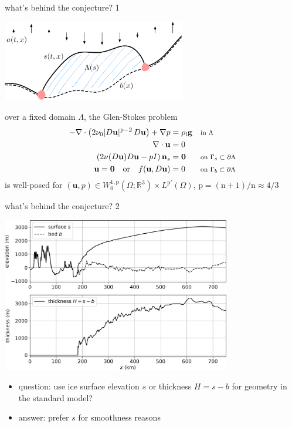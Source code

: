 \documentclass[10pt,dvipsnames]{beamer}
\theoremstyle{theorem}
\newcommand{\bg}{\mathbf{g}}
\newcommand{\bn}{\mathbf{n}}
\newcommand{\bu}{\mathbf{u}}
\newcommand{\bzero}{\bm{0}}
\newcommand{\RR}{\mathbb{R}}
\newcommand{\nn}{\mathrm{n}}
\newcommand{\pp}{\mathrm{p}}
\newcommand{\rhoi}{\rho_{\text{i}}}
\newcommand{\where}[1]{\text{\footnotesize #1}}
\begin{document}
\begin{frame}{what's behind the conjecture? 1}

\begin{center}
\includegraphics[width=0.6\textwidth]{stokesdomain}
\end{center}

\begin{theorem}
over a fixed domain $\Lambda$, the Glen-Stokes problem
\begin{align*}
- \nabla \cdot \left(2 \nu_0 |D\bu|^{\pp-2}\, D\bu\right) + \nabla p &= \rhoi \bg && \where{in $\Lambda$} \\
\nabla \cdot \bu &= 0 \\
\left(2 \nu(D\bu) D\bu - pI\right) \bn_s &= \bzero && \where{on $\Gamma_s \subset \partial\Lambda$} \\
\bu  = \bzero \quad \text{or} \quad f(\bu,D\bu) &= 0 && \where{on $\Gamma_b \subset \partial\Lambda$}
\end{align*}
is well-posed for $(\bu,p) \in W^{1,\pp}_0(\Omega;\RR^3) \times L^{\pp'}(\Omega)$, $\pp=(\nn+1)/\nn\approx 4/3$
\end{theorem}
\end{frame}


\begin{frame}{what's behind the conjecture? 2}

\bigskip
\begin{center}
\includegraphics[width=0.75\textwidth]{giscrossALPHA}
\end{center}

\begin{itemize}
\item question: use ice surface elevation $s$ or thickness $H = s - b$ for geometry in the standard model?
\item answer: prefer $s$ for smoothness reasons
\end{itemize}
\end{frame}
\end{document}
